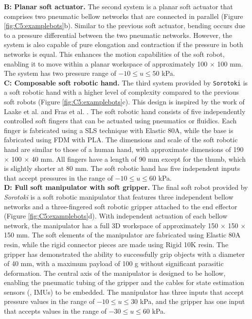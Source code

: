 \textbf{B: Planar soft actuator.} The second system is a planar soft actuator that comprises two pneumatic bellow networks that are connected in parallel (Figure \ref{fig:C5:examplebots}b). Similar to the previous soft actuator, bending occurs due to a pressure differential between the two pneumatic networks. However, the system is also capable of pure elongation and contraction if the pressure in both networks is equal. This enhances the motion capabilities of the soft robot, enabling it to move within a planar workspace of approximately 100 $\times$ 100 mm. The system has two pressure range of $-10 \le u \le 50$ kPa. \\

\textbf{C: Composable soft robotic hand.} The third system provided by \texttt{Sorotoki} is a soft robotic hand with a higher level of complexity compared to the previous soft robots (Figure \ref{fig:C5:examplebots}c). This design is inspired by the work of Laake et al. \cite{vanLaake2022Sep} and Fras et al. \cite{Fras2018Oct}. The soft robotic hand consists of five independently controlled soft fingers that can be actuated using pneumatics or fluidics. Each finger is fabricated using a SLS technique with Elastic 80A, while the base is fabricated using FDM with PLA. The dimensions and scale of the soft robotic hand are similar to those of a human hand, with approximate dimensions of 190 $\times$ 100 $\times$ 40 mm. All fingers have a length of 90 mm except for the thumb, which is slightly shorter at 80 mm. The soft robotic hand has five independent inputs that accept pressures in the range of $-10 \le u \le 60$ kPa. \\

\textbf{D: Full soft manipulator with soft gripper.}
The final soft robot provided by \textit{Sorotoki} is a soft robotic manipulator that features three independent bellow networks and a three-fingered soft robotic gripper attached to the end effector (Figure \ref{fig:C5:examplebots}d). With independent actuation of each bellow network, the manipulator has a full 3D workspace of approximately 150 $\times$ 150 $\times$ 150 \si{\milli \meter}. The soft elements of the manipulator are fabricated using Elastic 80A resin, while the rigid connector pieces are made using Rigid 10K resin. The gripper has demonstrated the ability to successfully grip objects with a diameter of 40 \si{\milli \meter}, with a maximum payload of 100 \si{\gram} without significant parasitic deformation. The central axis of the manipulator is designed to be hollow, enabling the pneumatic tubing of the gripper and the cables for state estimation sensors (\eg, IMUs) to be embedded. The manipulator has three inputs that accept pressure values in the range of $-10 \le u \le 30$ kPa, and the gripper has one input that accepts values in the range of $-30 \le u \le 60$ kPa. \\

